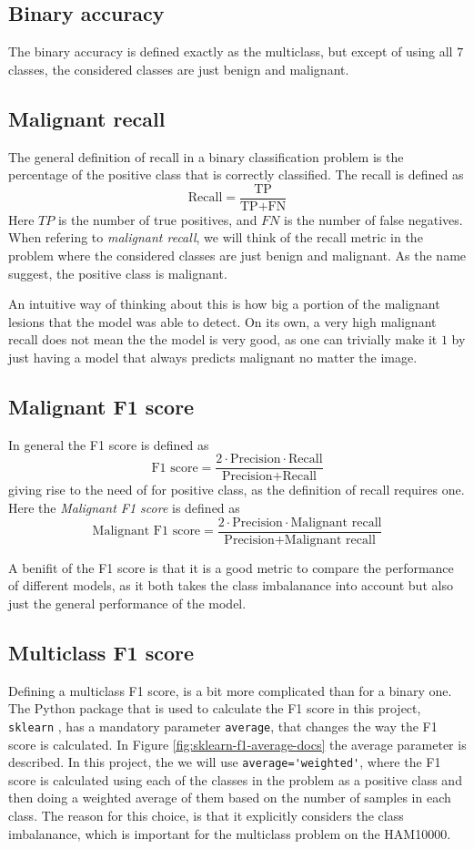 \subsection{Binary accuracy}
The binary accuracy is defined exactly as the multiclass, but except of using all $7$ classes,
the considered classes are just benign and malignant.

\subsection{Malignant recall}
The general definition of recall in a binary classification problem is the percentage of the positive class
that is correctly classified.
The recall is defined as
\[
    \text{Recall} = \frac{\text{TP}}{\text{TP} + \text{FN}}
\]
Here $TP$ is the number of true positives, and $FN$ is the number of false negatives.
When refering to \textit{malignant recall}, we will think of the recall metric in the problem
where the considered classes are just benign and malignant.
As the name suggest, the positive class is malignant.

An intuitive way of thinking about this is how big a portion of the malignant lesions
that the model was able to detect.
On its own, a very high malignant recall does not mean the the model is very good,
as one can trivially make it $1$ by just having a model that always predicts malignant no matter the image.

\subsection{Malignant F1 score}
In general the F1 score is defined as
\[
    \text{F1 score} = \frac{2 \cdot \text{Precision} \cdot \text{Recall}}{\text{Precision} + \text{Recall}}
\]
giving rise to the need of for positive class, as the definition of recall requires one.
Here the \textit{Malignant F1 score} is defined as
\[
    \text{Malignant F1 score} = \frac{2\cdot \text{Precision} \cdot \text{Malignant recall}}{\text{Precision} + \text{Malignant recall}}
\]

A benifit of the F1 score is that it is a good metric to compare the performance of different models,
as it both takes the class imbalanance into account but also just the general performance of the model.

\subsection{Multiclass F1 score}
Defining a multiclass F1 score, is a bit more complicated than for a binary one.
The Python package that is used to calculate the F1 score in this project, \verb|sklearn|
\cite{sklearn}, has a mandatory parameter \verb|average|, that changes the way the F1 score is calculated.
In Figure \ref{fig:sklearn-f1-average-docs} the average parameter is described.
In this project, the we will use \verb|average='weighted'|, where the F1 score is calculated
using each of the classes in the problem as a positive class and then doing a weighted average of them based
on the number of samples in each class.
The reason for this choice, is that it explicitly considers the class imbalanance,
which is important for the multiclass problem on the HAM10000.


